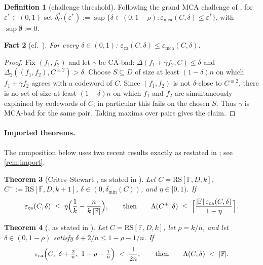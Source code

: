 \documentclass[11pt]{article}
\newtheorem{theorem}{Theorem}[section]
\newtheorem{fact}[theorem]{Fact}
\theoremstyle{definition}
\newtheorem{definition}[theorem]{Definition}
\theoremstyle{remark}
\newcommand{\F}{\mathbb{F}}
\newcommand{\RS}{\mathrm{RS}}
\newcommand{\eca}{\varepsilon_{\mathrm{ca}}}
\newcommand{\emca}{\varepsilon_{\mathrm{mca}}}
\newcommand{\dmin}{\delta_{\min}}
\newcommand{\dist}{\Delta}
\newcommand{\Lst}{\Lambda}
\begin{document}
\begin{definition}[challenge threshold]\label{def:dstar}
Following the grand MCA challenge of \cite[\S1]{ABF26}, for $\varepsilon^*\in(0,1)$ set
$\delta^*_C(\varepsilon^*):=\sup\{\delta\in(0,1-\rho):\emca(C,\delta)\le\varepsilon^*\}$, with $\sup\emptyset:=0$.
\end{definition}

\begin{fact}[{cf.\ \cite[Fact~4.5]{ABF26}}]\label{fact:chain}
For every $\delta\in(0,1)$: $\eca(C,\delta)\le\emca(C,\delta)$.
\end{fact}

\begin{proof}
Fix $(f_1,f_2)$ and let $\gamma$ be CA-bad: $\dist(f_1+\gamma f_2,C)\le\delta$ and $\dist_2((f_1,f_2),C^{\equiv2})>\delta$. Choose $S\subseteq D$ of size at least $(1-\delta)n$ on which $f_1+\gamma f_2$ agrees with a codeword of $C$. Since $(f_1,f_2)$ is not $\delta$-close to $C^{\equiv2}$, there is no set of size at least $(1-\delta)n$ on which $f_1$ and $f_2$ are simultaneously explained by codewords of $C$; in particular this fails on the chosen $S$. Thus $\gamma$ is MCA-bad for the same pair. Taking maxima over pairs gives the claim.
\end{proof}

\paragraph{Imported theorems.} The composition below uses two recent results exactly as restated in \cite{ABF26}; see \cref{rem:import}.

\begin{theorem}[Crites--Stewart {\cite[Thm.~2]{CS25}}, as stated in {\cite[Thm.~5.3]{ABF26}}]\label{thm:A}
Let $C=\RS[\F,D,k]$, $C^+:=\RS[\F,D,k+1]$, $\delta\in(0,\dmin(C))$, and $\eta\in[0,1)$. If
\[
\eca(C,\delta)\;\le\;\eta\Bigl(\frac1k-\frac n{k\,|\F|}\Bigr),
\qquad\text{then}\qquad
\Lst(C^+,\delta)\;\le\;\Bigl\lceil \frac{|\F|\,\eca(C,\delta)}{1-\eta}\Bigr\rceil .
\]
\end{theorem}

\begin{theorem}[{\cite[Thm.~1.9]{BCHKS25}}, as stated in {\cite[Thm.~5.2]{ABF26}}]\label{thm:B}
Let $C=\RS[\F,D,k]$, let $\rho=k/n$, and let $\delta\in(0,1-\rho)$ satisfy $\delta+2/n\le 1-\rho-1/n$. If
\[
\eca\Bigl(C,\ \delta+\tfrac2n,\ 1-\rho-\tfrac1n\Bigr)\;<\;\frac1{2n},
\qquad\text{then}\qquad
\Lst(C,\delta)\;<\;|\F| .
\]
\end{theorem}
\end{document}
